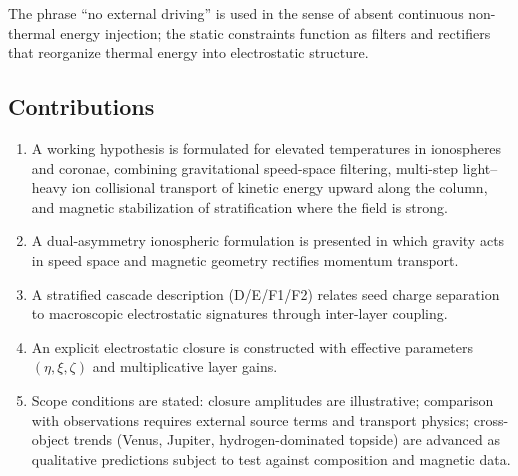 \documentclass[11pt,a4paper]{article}
\begin{document}
The phrase ``no external driving'' is used in the sense of absent continuous non-thermal energy injection; the static constraints function as filters and rectifiers that reorganize thermal energy into electrostatic structure.

\subsection*{Contributions}
\begin{enumerate}
  \item A working hypothesis is formulated for elevated temperatures in ionospheres and coronae, combining gravitational speed-space filtering, multi-step light--heavy ion collisional transport of kinetic energy upward along the column, and magnetic stabilization of stratification where the field is strong.
  \item A dual-asymmetry ionospheric formulation is presented in which gravity acts in speed space and magnetic geometry rectifies momentum transport.
  \item A stratified cascade description (D/E/F1/F2) relates seed charge separation to macroscopic electrostatic signatures through inter-layer coupling.
  \item An explicit electrostatic closure is constructed with effective parameters $(\eta,\xi,\zeta)$ and multiplicative layer gains.
  \item Scope conditions are stated: closure amplitudes are illustrative; comparison with observations requires external source terms and transport physics; cross-object trends (Venus, Jupiter, hydrogen-dominated topside) are advanced as qualitative predictions subject to test against composition and magnetic data.
\end{enumerate}
\end{document}
